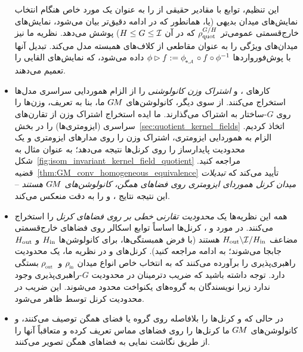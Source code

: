 \begin{itemize}
	این تنظیم، توابع با مقادیر حقیقی از \cite{Kondor2018-GENERAL,bekkers2020bspline} را به عنوان یک مورد خاص هنگام انتخاب نمایش‌های میدان بدیهی
	(یا، همانطور که در ادامه دقیق‌تر بیان می‌شود، نمایش‌های خارج‌قسمتی عمومی‌تر $\rho_\textup{quot}^{G/H}$ که در آن $H\leq G\leq\mathcal{I}$) پوشش می‌دهد.
	نظریه ما نیز میدان‌های ویژگی را به عنوان مقاطعی از کلاف‌های همبسته مدل می‌کند.
	تبدیل آنها با پوش‌فورواردها $\phi \rhd f := \dphiA \circ f \circ \phi^{-1}$ داده می‌شود، که نمایش‌های القایی را تعمیم می‌دهند.
	\item[{\rule[2.2pt]{2pt}{2pt}}]
	کارهای \citet{Kondor2018-GENERAL}، \citet{Cohen2018-intertwiners}\cite{Cohen2019-generaltheory} و \citet{bekkers2020bspline} \emph{اشتراک وزن کانولوشنی} را از الزام هموردایی سراسری مدل‌ها استخراج می‌کنند.
	از سوی دیگر، کانولوشن‌های $G\mkern-1.4muM$ ما، بنا به تعریف، وزن‌ها را روی $G$-ساختار به اشتراک می‌گذارند.
	ما ایده استخراج اشتراک وزن از تقارن‌های سراسری (ایزومتری‌ها) را در بخش~\ref{sec:quotient_kernel_fields} اتخاذ کردیم.
	الزام به هموردایی ایزومتری، اشتراک وزن را روی مدارهای ایزومتری و یک محدودیت پایدارساز را روی کرنل‌ها نتیجه می‌دهد؛ به عنوان مثال به شکل~\ref{fig:isom_invariant_kernel_field_quotient} مراجعه کنید.
	قضیه~\ref{thm:GM_conv_homogeneous_equivalence} تأیید می‌کند که \emph{تبدیلات میدان کرنل هموردای ایزومتری روی فضاهای همگن، کانولوشن‌های $G\mkern-1.4muM$ هستند} -- این نتیجه نتایج \citet{Kondor2018-GENERAL}، \citet{Cohen2018-intertwiners}\cite{Cohen2019-generaltheory} و \citet{bekkers2020bspline}
	را به دقت منعکس می‌کند.
	\item[{\rule[2.2pt]{2pt}{2pt}}]
	همه این نظریه‌ها یک \emph{محدودیت تقارنی خطی بر روی فضاهای کرنل} را استخراج می‌کنند.
	در مورد \citet{Kondor2018-GENERAL} و \citet{bekkers2020bspline}، کرنل‌ها اساساً توابع اسکالر روی فضاهای خارج‌قسمتی مضاعف $H_{\textup{out}}\backslash \mathcal{I}/H_{\textup{in}}$ هستند (با فرض همبستگی‌ها، برای کانولوشن‌ها $H_{\textup{in}}$ و $H_{\textup{out}}$ جابجا می‌شوند؛ به ادامه مراجعه کنید).
	کرنل‌های \citet{Cohen2018-intertwiners}\cite{Cohen2019-generaltheory} و در نظریه ما، یک محدودیت راهبری‌پذیری را برآورده می‌کنند که به انتخاب خاص انواع میدان $\rhoin$ و~$\rhoout$ بستگی دارد.
	توجه داشته باشید که ضریب دترمینان در محدودیت $G$-راهبری‌پذیری \citet{Cohen2018-intertwiners}\cite{Cohen2019-generaltheory} وجود ندارد زیرا نویسندگان به گروه‌های یکنواخت محدود می‌شوند.
	این ضریب در محدودیت کرنل توسط \citet{bekkers2020bspline} ظاهر می‌شود.
	\item[{\rule[2.2pt]{2pt}{2pt}}]
	در حالی که \citet{Kondor2018-GENERAL} و \citet{Cohen2018-intertwiners}\cite{Cohen2019-generaltheory} کرنل‌ها را بلافاصله روی گروه یا فضای همگن توصیف می‌کنند،
	\citet{bekkers2020bspline} و کانولوشن‌های $G\mkern-1.4muM$ ما کرنل‌ها را روی فضاهای مماس تعریف کرده و متعاقباً آنها را از طریق نگاشت نمایی به فضاهای همگن تصویر می‌کنند.

\end{itemize}
